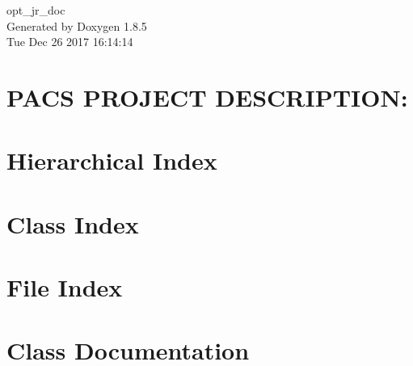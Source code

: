 \documentclass[twoside]{book}
\newcommand{\clearemptydoublepage}{%
  \newpage{\pagestyle{empty}\cleardoublepage}%
}
\begin{document}
\hypersetup{pageanchor=false}
\begin{titlepage}
\vspace*{7cm}
\begin{center}%
{\Large opt\-\_\-jr\-\_\-doc }\\
\vspace*{1cm}
{\large Generated by Doxygen 1.8.5}\\
\vspace*{0.5cm}
{\small Tue Dec 26 2017 16:14:14}\\
\end{center}
\end{titlepage}
\clearemptydoublepage
\tableofcontents
\clearemptydoublepage
{}
\hypersetup{pageanchor=true}

\chapter{P\-A\-C\-S P\-R\-O\-J\-E\-C\-T D\-E\-S\-C\-R\-I\-P\-T\-I\-O\-N\-:}
\label{md__vagrant_PROJECT_SPARK_PACS_PROJECT_README}
\hypertarget{md__vagrant_PROJECT_SPARK_PACS_PROJECT_README}{}

\chapter{Hierarchical Index}

\chapter{Class Index}

\chapter{File Index}

\chapter{Class Documentation}
















\end{document}
